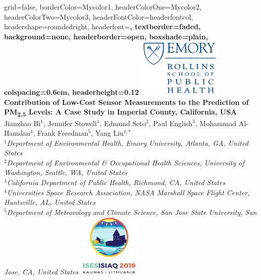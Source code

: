 \documentclass[a0paper,portrait]{baposter}
\newcommand{\tsub}{\textsubscript}
\begin{document}
\begin{poster}{
grid=false,
borderColor=Mycolor1, %
headerColorOne=Mycolor2, %
headerColorTwo=Mycolor3, %
headerFontColor=headerfontcol, %
headershape=roundedright, %
headerfont=\Large\sf\bf, %
textborder=faded,
background=none,
headerborder=open, %
boxshade=plain,
colspacing=0.6em,
headerheight=0.12\textheight
}
{\includegraphics[height=28mm]{rsph2.png}}
%
%
{ \bf  \Large {Contribution of Low-Cost Sensor Measurements to the Prediction of PM\tsub{2.5} Levels: A Case Study in Imperial County, California, USA} }
{\vspace{0.3em} \smaller Jianzhao Bi$^1$, Jennifer Stowell$^1$, Edmund Seto$^2$, Paul English$^3$, Mohammad Al-Hamdan$^4$, Frank Freedman$^5$, Yang Liu$^{1,\ast}$\\  %
\footnotesize $^1$\it {Department of Environmental Health, Emory University, Atlanta, GA, United States} \\
\footnotesize $^2$\it {Department of Environmental \& Occupational Health Sciences, University of Washington, Seattle, WA, United States} \\
\footnotesize $^3$\it {California Department of Public Health, Richmond, CA, United States} \\
\footnotesize $^4$\it {Universities Space Research Association, NASA Marshall Space Flight Center, Huntsville, AL, United States} \\
\footnotesize $^5$\it {Department of Meteorology and Climate Science, San Jose State University, San Jose, CA, United States}
}
{\includegraphics[height=30mm]{ises2.png}} 


\end{poster}
\end{document}
